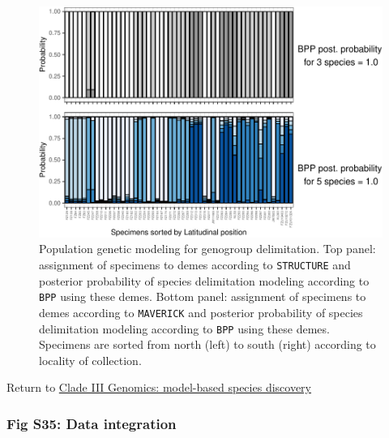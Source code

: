 \documentclass[
  11pt,
]{article}
\begin{document}
\begin{figure}
\includegraphics{Supplementary_Material_files/figure-latex/cladeIIImolecularDelimitationPopGenBpp-1} \caption{Population genetic modeling for genogroup delimitation. Top panel: assignment of specimens to demes according to \texttt{STRUCTURE} and posterior probability of species delimitation modeling according to \texttt{BPP} using these demes. Bottom panel: assignment of specimens to demes according to \texttt{MAVERICK} and posterior probability of species delimitation modeling according to \texttt{BPP} using these demes. Specimens are sorted from north (left) to south (right) according to locality of collection.}\label{fig:cladeIIImolecularDelimitationPopGenBpp}
\end{figure}

Return to \protect\hyperlink{model-based-species-discovery-5}{Clade III Genomics: model-based species discovery}
\pagebreak

\hypertarget{fig-s35-data-integration}{%
\subsubsection{Fig S35: Data integration}\label{fig-s35-data-integration}}
\end{document}
